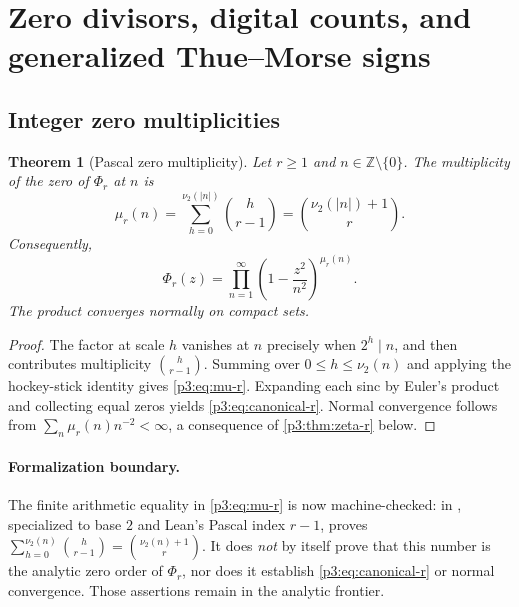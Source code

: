 \documentclass[11pt,oneside]{article}
\newtheorem{theorem}{Theorem}[section]
\theoremstyle{definition}
\theoremstyle{remark}
\newcommand{\Z}{\mathbb Z}
\begin{document}
\section{Zero divisors, digital counts, and generalized Thue--Morse signs}\label{p3:sec:digital}

\subsection{Integer zero multiplicities}

\begin{theorem}[Pascal zero multiplicity]\label{p3:thm:zero-multiplicity}
Let $r\ge1$ and $n\in\Z\setminus\{0\}$.  The multiplicity of the zero of $\Phi_r$ at $n$ is
\begin{equation}\label{p3:eq:mu-r}
  \mu_r(n)=\sum_{h=0}^{\nu_2(|n|)}\binom h{r-1}
  =\binom{\nu_2(|n|)+1}{r}.
\end{equation}
Consequently,
\begin{equation}\label{p3:eq:canonical-r}
  \Phi_r(z)=\prod_{n=1}^{\infty}
  \left(1-\frac{z^2}{n^2}\right)^{\mu_r(n)}.
\end{equation}
The product converges normally on compact sets.
\end{theorem}

\begin{proof}
The factor at scale $h$ vanishes at $n$ precisely when $2^h\mid n$, and then contributes multiplicity $\binom h{r-1}$.  Summing over $0\le h\le\nu_2(n)$ and applying the hockey-stick identity gives \eqref{p3:eq:mu-r}.  Expanding each sinc by Euler's product and collecting equal zeros yields \eqref{p3:eq:canonical-r}.  Normal convergence follows from
$\sum_n\mu_r(n)n^{-2}<\infty$, a consequence of \cref{p3:thm:zeta-r} below.
\end{proof}

\paragraph{Formalization boundary.}
The finite arithmetic equality in \eqref{p3:eq:mu-r} is now machine-checked:
 in
, specialized to base $2$ and Lean's
Pascal index $r-1$, proves
$\sum_{h=0}^{\nu_2(n)}\binom h{r-1}=\binom{\nu_2(n)+1}r$.
It does \emph{not} by itself prove that this number is the analytic zero
order of $\Phi_r$, nor does it establish \eqref{p3:eq:canonical-r} or normal
convergence.  Those assertions remain in the analytic frontier.
\end{document}
